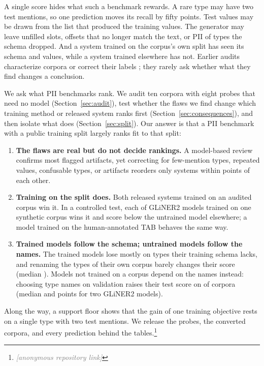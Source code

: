 \documentclass[11pt]{article}
\newcommand{\pending}[1]{\textcolor{gray}{\textit{[#1]}}}
\begin{document}
A single score hides what such a benchmark rewards. A rare type may have
two test mentions, so one prediction moves its recall by fifty points. Test
values may be drawn from the list that produced the training values. The
generator may leave unfilled slots, offsets that no longer match the
text, or PII of types the schema dropped. And a system trained on the
corpus's own split has seen its schema and values, while a system
trained elsewhere has not. Earlier audits characterize corpora
\cite{leaman2026biomedical} or correct their labels
\cite{rucker2023cleanconll}; they rarely ask whether what they find
changes a conclusion.

We ask what PII benchmarks rank. We audit ten corpora with eight
probes that need no model (Section~\ref{sec:audit}), test whether the
flaws we find change which training method or released system ranks
first (Section~\ref{sec:consequences}), and then isolate what does
(Section~\ref{sec:split}). Our answer is that a PII benchmark with a
public training split largely ranks fit to that split:
\begin{enumerate}
\item \textbf{The flaws are real but do not decide rankings.} A
model-based review confirms most flagged artifacts, yet correcting for
few-mention types, repeated values, confusable types, or artifacts
reorders only systems within  points of each other.
\item \textbf{Training on the split does.} Both released systems
trained on an audited corpus win it. In a controlled test, each of
 GLiNER2 models trained on one synthetic corpus wins it and
 score below the untrained model elsewhere; a model
trained on the human-annotated TAB behaves the same way.
\item \textbf{Trained models follow the schema; untrained models
follow the names.} The trained models lose mostly on types their
training schema lacks, and renaming the types of their own corpus
barely changes their score (median ). Models not trained
on a corpus depend on the names instead: choosing type names on
validation raises their test score on  of
 corpora (median  and  points for two
GLiNER2 models).
\end{enumerate}
Along the way, a support floor shows that the gain of one training
objective rests on a single type with two test mentions. We release the
probes, the converted corpora, and every prediction behind the
tables.\footnote{\pending{anonymous repository link}}
\end{document}
